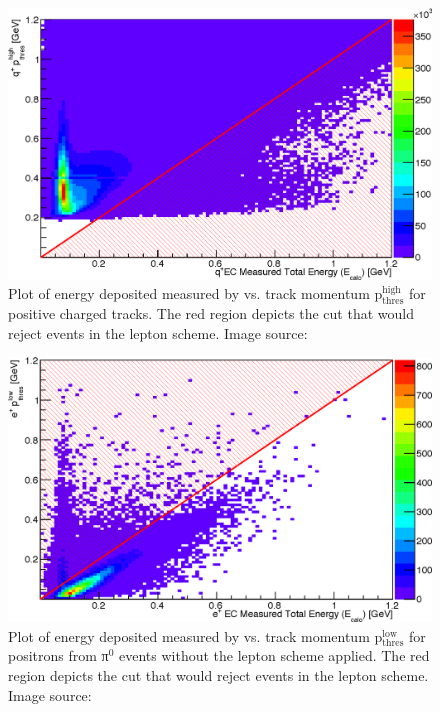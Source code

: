 \begin{figure}\begin{center}
\includegraphics[width=0.45\columnwidth]{figures/lepton/Pip_EChigh.eps}
\caption[ Deposited Energy Comparison to Upper Threshold Track Momentum for q$^+$ Tracks]{\label{fig:islep.pipEChigh}Plot of energy deposited measured by  vs. track momentum p$\mathrm{_{thres}^{high}}$ for positive charged tracks. The red region depicts the cut that would reject events in the  lepton   scheme. Image source:~\cite{clas.thesis.kunkel}}
\end{center}\end{figure}

\begin{figure}\begin{center}
\includegraphics[width=0.45\columnwidth]{figures/lepton/Pip_EClowcut.eps}
\caption[ Deposited Energy Comparison to Track Momentum for e$^+$ Candidates]{\label{fig:islep.pipEC}Plot of energy deposited measured by  vs. track momentum p$\mathrm{_{thres}^{low}}$ for positrons from π$^0$ events without the  lepton   scheme applied. The red region depicts the cut that would reject events in the  lepton   scheme. Image source:~\cite{clas.thesis.kunkel}}
\end{center}\end{figure}

